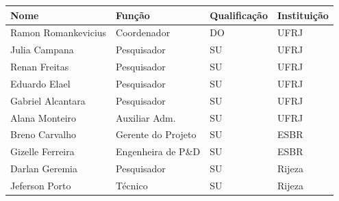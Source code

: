 \begin{onecolumn}
\thispagestyle{empty}


\begin{center}

  
 \vfill



  
  \vspace{0.50cm}



  \begin{center}
    \begin{tabular}{| l | l | l | l |}
    
    \hline
   	 Nome 					& Função			 & Qualificação 	& Instituição	 \\\hline
   	 Ramon Romankevicius 	& Coordenador 	 	 & DO			    & UFRJ  	\\\hline
   	 Julia Campana 			& Pesquisador		 & SU 			    & UFRJ 		\\\hline
   	 Renan Freitas 			& Pesquisador 	 	 & SU 			    & UFRJ 		\\\hline
   	 Eduardo Elael 			& Pesquisador 	 	 & SU 			    & UFRJ		\\\hline
  	 Gabriel Alcantara 		& Pesquisador 	 	 & SU 			    & UFRJ 		\\\hline
   	 Alana Monteiro 		& Auxiliar Adm. 	 & SU 			    & UFRJ 		\\\hline 		
	 Breno Carvalho			& Gerente do Projeto & SU 			    & ESBR 		\\\hline
	 Gizelle Ferreira 		& Engenheira de P\&D & SU 				& ESBR 		\\\hline
	 Darlan Geremia 		& Pesquisador		 & SU 				& Rijeza 	\\\hline
	 Jeferson Porto  		& Técnico			 & SU 				& Rijeza 	\\\hline
	  
\hline

    
    \hline 
    \end{tabular}
\end{center}

\end{center}
\end{onecolumn}

\newpage

\hypersetup{pageanchor=true}

